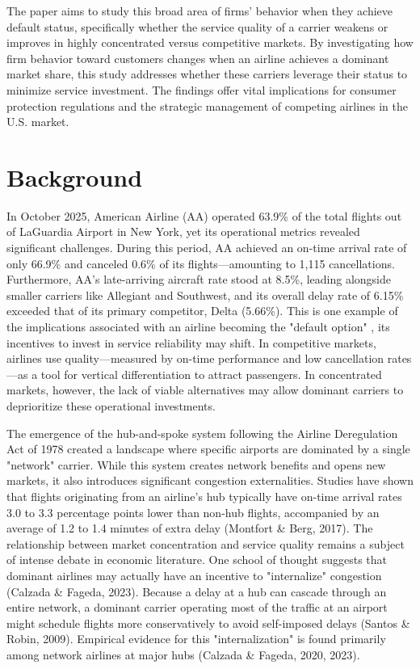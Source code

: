 \documentclass[preprint,12pt,authoryear]{elsarticle}
\begin{document}
The paper aims to study this broad area of firms' behavior when they achieve default status, specifically whether the service quality of a carrier weakens or improves in highly concentrated versus competitive markets.  By investigating how firm behavior toward customers changes when an airline achieves a dominant market share, this study addresses whether these carriers leverage their status to minimize service investment. The findings offer vital implications for consumer protection regulations and the strategic management of competing airlines in the U.S. market.



\section{Background}
\label{sec:background}

In October 2025, American Airline (AA) operated  63.9\% of the total flights out of LaGuardia Airport in New York, yet its operational metrics revealed significant challenges. During this period, AA achieved an on-time arrival rate of only 66.9\% and canceled 0.6\% of its flights—amounting to 1,115 cancellations. Furthermore, AA’s late-arriving aircraft rate stood at 8.5\%, leading alongside smaller carriers like Allegiant and Southwest, and its overall delay rate of 6.15\% exceeded that of its primary competitor, Delta (5.66\%). This is one example of the implications associated with an airline becoming the "default option" , its incentives to invest in service reliability may shift. In competitive markets, airlines use quality—measured by on-time performance and low cancellation rates—as a tool for vertical differentiation to attract passengers. In concentrated markets, however, the lack of viable alternatives may allow dominant carriers to deprioritize these operational investments. 


The emergence of the hub-and-spoke system following the Airline Deregulation Act of 1978 created a landscape where specific airports are dominated by a single "network" carrier. While this system creates network benefits and opens new markets, it also introduces significant congestion externalities. Studies have shown that flights originating from an airline’s hub typically have on-time arrival rates 3.0 to 3.3 percentage points lower than non-hub flights, accompanied by an average of 1.2 to 1.4 minutes of extra delay (Montfort \& Berg, 2017). The relationship between market concentration and service quality remains a subject of intense debate in economic literature. One school of thought suggests that dominant airlines may actually have an incentive to "internalize" congestion (Calzada \& Fageda, 2023). Because a delay at a hub can cascade through an entire network, a dominant carrier operating most of the traffic at an airport might schedule flights more conservatively to avoid self-imposed delays (Santos \& Robin, 2009). Empirical evidence for this "internalization" is found primarily among network airlines at major hubs (Calzada \& Fageda, 2020, 2023).
\end{document}
